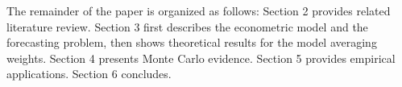 The remainder of the paper is organized as follows: Section 2 provides related literature review. Section 3 first describes the econometric model and the forecasting problem, then shows theoretical results for the model averaging weights. Section 4 presents Monte Carlo evidence. Section 5 provides empirical applications. Section 6 concludes. 